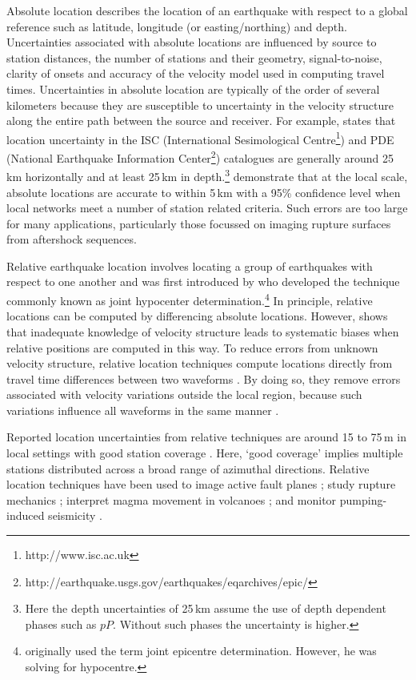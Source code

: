 \documentclass[extra, onecolumn, doublespacing]{gji}
\begin{document}
Absolute location describes the location of an earthquake with
respect to a global reference such as latitude, longitude (or
easting/northing) and depth. Uncertainties associated with absolute
locations are influenced by source to station distances, the number
of stations and their geometry, signal-to-noise, clarity of onsets
and accuracy of the velocity model used in computing travel times.
Uncertainties in absolute location are typically of the order of
several kilometers because they are susceptible to uncertainty in
the velocity structure along the entire path between the source and
receiver. For example, \citet{dr_Shearer99a} states that location
uncertainty in the ISC (International Sesimological
Centre\footnote{http://www.isc.ac.uk}) and PDE (National Earthquake
Information
Center\footnote{http://earthquake.usgs.gov/earthquakes/eqarchives/epic/})
catalogues are generally around 25\,km horizontally and at least
25\,km in depth.\footnote{Here the depth uncertainties of 25\,km
assume the use of depth dependent phases such as $pP$. Without such
phases the uncertainty is higher.} \citet{dr_Bondar04a} demonstrate
that at the local scale, absolute locations are accurate to within
5\,km with a 95\% confidence level when local networks meet a number
of station related criteria. Such errors are too large for many
applications, particularly those focussed on imaging rupture
surfaces from aftershock sequences.

Relative earthquake location involves locating a group of
earthquakes with respect to one another and was first introduced by
\citet{dr_Douglas67a} who developed the technique commonly known as
joint hypocenter determination.\footnote{\citet{dr_Douglas67a}
originally used the term joint epicentre determination. However, he
was solving for hypocentre.} In principle, relative locations can be
computed by differencing absolute locations. However,
\citet{dr_Pavlis92a} shows that inadequate knowledge of velocity
structure leads to systematic biases when relative positions are
computed in this way. To reduce errors from unknown velocity
structure, relative location techniques compute locations directly
from travel time differences between two waveforms
\citep{dr_Ito85a, dr_Got94a, dr_Nadeau97a, dr_Waldhauser99a}. By doing
so, they remove errors associated with velocity variations outside
the local region, because such variations influence all waveforms in
the same manner \citep{dr_Shearer99a}.

Reported location uncertainties from relative techniques are  around
15 to 75\,m in local settings with good station coverage
\citep{dr_Ito85a, dr_Got94a, dr_Waldhauser99a,dr_Waldhauser08a}.
Here, `good coverage' implies multiple stations distributed across a
broad range of azimuthal directions. Relative location techniques
have been used to image active fault planes \citep{dr_Deichmann92a,
dr_Got94a, dr_Waldhauser99a, dr_Waldhauser02a, dr_Shearer05a}; study
rupture mechanics \citep{dr_Rubin99a, dr_Rubin02a}; interpret magma
movement in volcanoes \citep{dr_Fremont87a}; and monitor
pumping-induced seismicity \citep{dr_Lees98a, dr_Ake05a}.
\end{document}
